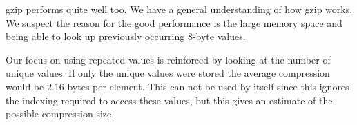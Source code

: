 \par gzip performs quite well too. We have a general understanding of how gzip works. We suspect the reason for the good performance is the large memory space and being able to look up previously occurring 8-byte values.
\par Our focus on using repeated values is reinforced by looking at the number of unique values. If only the unique values were stored the average compression would be $2.16$ bytes per element. This can not be used by itself since this ignores the indexing required to access these values, but this gives an estimate of the possible compression size.
\begin{figure}
\center
{}
\end{figure}
